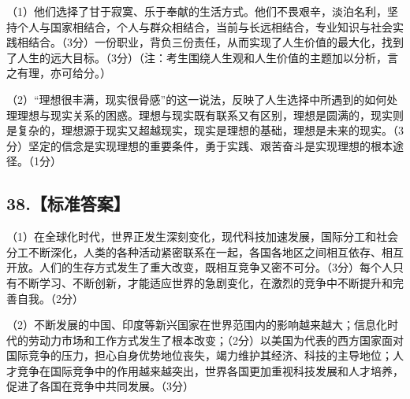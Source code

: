 \documentclass[UTF8,11pt]{ctexart}
\begin{document}
（1）他们选择了甘于寂寞、乐于奉献的生活方式。他们不畏艰辛，淡泊名利，坚持个人与国家相结合，个人与群众相结合，当前与长远相结合，专业知识与社会实践相结合。（3分）一份职业，背负三份责任，从而实现了人生价值的最大化，找到了人生的远大目标。（3分）（注：考生围绕人生观和人生价值的主题加以分析，言之有理，亦可给分。）


（2）“理想很丰满，现实很骨感”的这一说法，反映了人生选择中所遇到的如何处理理想与现实关系的困惑。理想与现实既有联系又有区别，理想是圆满的，现实则是复杂的，理想源于现实又超越现实，现实是理想的基础，理想是未来的现实。（3分）坚定的信念是实现理想的重要条件，勇于实践、艰苦奋斗是实现理想的根本途径。（1分）


\subsection*{38.【标准答案】}

（1）在全球化时代，世界正发生深刻变化，现代科技加速发展，国际分工和社会分工不断深化，人类的各种活动紧密联系在一起，各国各地区之间相互依存、相互开放。人们的生存方式发生了重大改变，既相互竞争又密不可分。（3分）每个人只有不断学习、不断创新，才能适应世界的急剧变化，在激烈的竞争中不断提升和完善自我。（2分）


（2）不断发展的中国、印度等新兴国家在世界范围内的影响越来越大；信息化时代的劳动力市场和工作方式发生了根本改变；（2分）以美国为代表的西方国家面对国际竞争的压力，担心自身优势地位丧失，竭力维护其经济、科技的主导地位；人才竞争在国际竞争中的作用越来越突出，世界各国更加重视科技发展和人才培养，促进了各国在竞争中共同发展。（3分）
\end{document}
